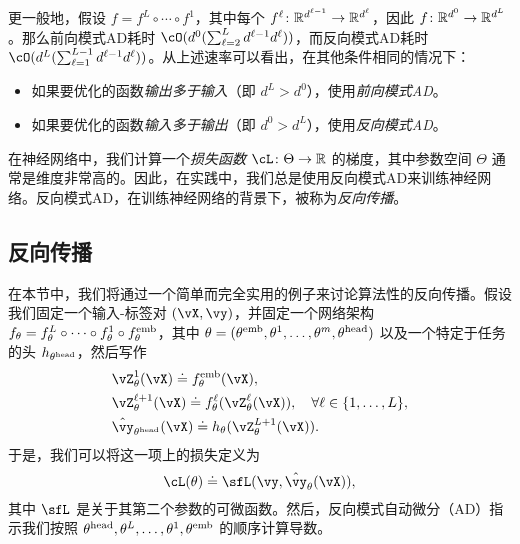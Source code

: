 \documentclass[../../book-main_zh.tex]{subfiles}
\begin{document}
更一般地，假设 \(f = f^{L} \circ \cdots \circ f^{1}\)，其中每个 \(f^{\ell} \colon \mathbb{R}^{d^{\ell - 1}} \to \mathbb{R}^{d^{\ell}}\)，因此 \(f \colon \mathbb{R}^{d^{0}} \to \mathbb{R}^{d^{L}}\)。那么前向模式AD耗时 \(\cO(d^{0}(\sum_{\ell = 2}^{L}d^{\ell - 1}d^{\ell}))\)，而反向模式AD耗时 \(\cO(d^{L}(\sum_{\ell = 1}^{L - 1}d^{\ell - 1}d^{\ell}))\)。从上述速率可以看出，在其他条件相同的情况下：
\begin{itemize}
    \item 如果要优化的函数\textit{输出多于输入}（即 \(d^{L} > d^{0}\)），使用\textit{前向模式AD}。
    \item 如果要优化的函数\textit{输入多于输出}（即 \(d^{0} > d^{L}\)），使用\textit{反向模式AD}。
\end{itemize}
在神经网络中，我们计算一个\textit{损失函数} \(\cL \colon \Theta \to \R\) 的梯度，其中参数空间 \(\Theta\) 通常是维度非常高的。因此，在实践中，我们总是使用反向模式AD来训练神经网络。反向模式AD，在训练神经网络的背景下，被称为\textit{反向传播}。

\subsection{反向传播}
\label{app:BP-section}
在本节中，我们将通过一个简单而完全实用的例子来讨论算法性的反向传播。假设我们固定一个输入-标签对 \((\vX, \vy)\)，并固定一个网络架构 \(f_{\theta} = f_{\theta}^{L} \circ \cdots \circ f_{\theta}^{1} \circ f_{\theta}^{\mathrm{emb}}\)，其中 \(\theta = (\theta^{\mathrm{emb}}, \theta^{1}, \dots, \theta^{m}, \theta^{\mathrm{head}})\) 以及一个特定于任务的头 \(h_{\theta^{\mathrm{head}}}\)，然后写作
\begin{align}
    &\vZ_{\theta}^{1}(\vX) \doteq f_{\theta}^{\emb}(\vX), \\ 
    &\vZ_{\theta}^{\ell + 1}(\vX) \doteq f_{\theta}^{\ell}(\vZ_{\theta}^{\ell}(\vX)), \quad \forall \ell \in \{1, \dots, L\}, \\
    &\hat{\vy}_{\theta^{\head}}(\vX) \doteq h_{\theta}(\vZ_{\theta}^{L+1}(\vX)).
\end{align}
于是，我们可以将这一项上的损失定义为
\begin{equation}
    \cL(\theta) \doteq \sfL(\vy, \hat{\vy}_{\theta}(\vX)),
\end{equation}
其中 \(\sfL\) 是关于其第二个参数的可微函数。然后，反向模式自动微分（AD）指示我们按照 \(\theta^{\mathrm{head}}, \theta^{L}, \dots, \theta^{1}, \theta^{\mathrm{emb}}\) 的顺序计算导数。
\end{document}
